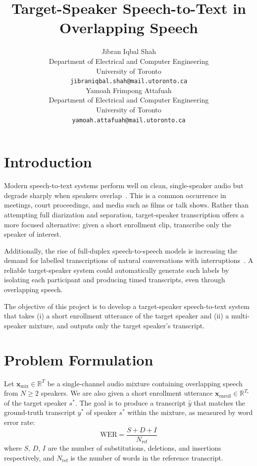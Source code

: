 \documentclass{article}
\title{Target-Speaker Speech-to-Text in Overlapping Speech}
\author{%
  Jibran Iqbal Shah\\
  Department of Electrical and Computer Engineering\\
  University of Toronto\\
  \texttt{jibraniqbal.shah@mail.utoronto.ca} \\
  \And
  Yamoah Frimpong Attafuah\\
  Department of Electrical and Computer Engineering\\
  University of Toronto\\
  \texttt{yamoah.attafuah@mail.utoronto.ca} \\
}
\begin{document}
\maketitle



\section{Introduction}

Modern speech-to-text systems perform well on clean, single-speaker audio but degrade sharply when speakers overlap~\citep{Chime, overlap}. This is a common occurrence in meetings, court proceedings, and media such as films or talk shows. Rather than attempting full diarization and separation, target-speaker transcription offers a more focused alternative: given a short enrollment clip, transcribe only the speaker of interest.

Additionally, the rise of full-duplex speech-to-speech models is increasing the demand for labelled transcriptions of natural conversations with interruptions~\citep{Moshi, PersonaPlex}. A reliable target-speaker system could automatically generate such labels by isolating each participant and producing timed transcripts, even through overlapping speech.

The objective of this project is to develop a target-speaker speech-to-text system that takes (i) a short enrollment utterance of the target speaker and (ii) a multi-speaker mixture, and outputs only the target speaker's transcript.


\section{Problem Formulation}

Let $\mathbf{x}_{\text{mix}} \in \mathbb{R}^T$ be a single-channel audio mixture containing overlapping speech from $N \geq 2$ speakers. We are also given a short enrollment utterance $\mathbf{x}_{\text{enroll}} \in \mathbb{R}^{T_e}$ of the target speaker $s^*$. The goal is to produce a transcript $\hat{y}$ that matches the ground-truth transcript $y^*$ of speaker $s^*$ within the mixture, as measured by word error rate:
\[
\text{WER} = \frac{S + D + I}{N_{\text{ref}}}
\]
where $S$, $D$, $I$ are the number of substitutions, deletions, and insertions respectively, and $N_{\text{ref}}$ is the number of words in the reference transcript.
\end{document}
